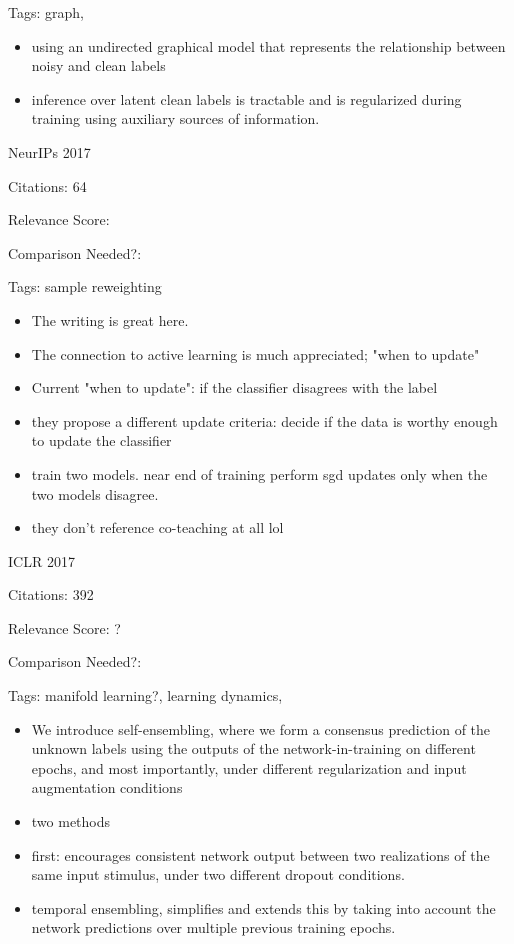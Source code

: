\documentclass[11pt]{article}
\begin{document}
\noindent Tags: graph, 

\begin{itemize}
\item using an undirected graphical model that
represents the relationship between noisy and clean labels
\item inference over latent clean labels is
tractable and is regularized during training using auxiliary sources of information.
\end{itemize}

\vspace{2cm}

\noindent NeurIPs 2017

\noindent Citations: 64

\noindent Relevance Score:

\noindent Comparison Needed?: 

\noindent Tags: sample reweighting

\begin{itemize}
\item The writing is great here.
\item The connection to active learning is much appreciated; "when to update"
\item Current "when to update": if the classifier disagrees with the label
\item they propose a different update criteria: decide if the data is worthy enough to update the classifier
\item train two models. near end of training perform sgd updates only when the two models disagree.
\item they don't reference co-teaching at all lol
\end{itemize}

\vspace{2cm}

\noindent ICLR 2017

\noindent Citations: 392

\noindent Relevance Score: ?

\noindent Comparison Needed?: 

\noindent Tags: manifold learning?, learning dynamics,  


\begin{itemize}
\item We introduce self-ensembling, where we form a consensus prediction
of the unknown labels using the outputs of the network-in-training on different
epochs, and most importantly, under different regularization and input augmentation conditions
\item two methods
\item first: encourages consistent network output between two realizations of the same input stimulus, under two
different dropout conditions.
\item temporal ensembling, simplifies and extends this
by taking into account the network predictions over multiple previous training epochs.
\end{itemize}
\end{document}
